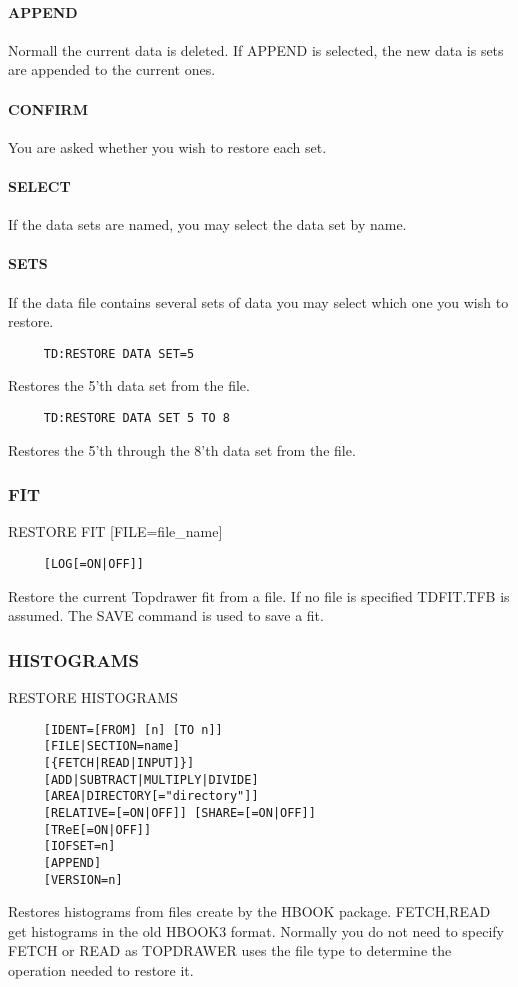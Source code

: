 \paragraph{APPEND}
Normall  the current data is deleted.  If APPEND is selected, the new
data is sets are appended to the current ones.  
\paragraph{CONFIRM}
You are asked whether you wish to restore each set.  
\paragraph{SELECT}
If the data sets are named, you may select the data set by name.  
\paragraph{SETS}
If  the  data file contains several sets of data you may select which
one you wish to restore.  
\begin{verbatim}
     TD:RESTORE DATA SET=5 
\end{verbatim}
Restores the 5'th data set from the file.  
\begin{verbatim}
     TD:RESTORE DATA SET 5 TO 8 
\end{verbatim}
Restores the 5'th through the 8'th data set from the file.  
\subsubsection{FIT}
RESTORE FIT [FILE=file\_name] 
\begin{verbatim}
     [LOG[=ON|OFF]] 
\end{verbatim}
Restore the current Topdrawer fit from a file.  If no file is specified
TDFIT.TFB is assumed.  The SAVE command is used to save a fit.  
\subsubsection{HISTOGRAMS}
RESTORE HISTOGRAMS 
\begin{verbatim}
     [IDENT=[FROM] [n] [TO n]] 
     [FILE|SECTION=name] 
     [{FETCH|READ|INPUT]}] 
     [ADD|SUBTRACT|MULTIPLY|DIVIDE] 
     [AREA|DIRECTORY[="directory"]] 
     [RELATIVE=[=ON|OFF]] [SHARE=[=ON|OFF]] 
     [TReE[=ON|OFF]] 
     [IOFSET=n] 
     [APPEND] 
     [VERSION=n] 
\end{verbatim}
Restores histograms from files create by the HBOOK package.  FETCH,READ
get histograms in the old HBOOK3 format.  Normally you do not  need  to
specify  FETCH or READ as TOPDRAWER uses the file type to determine the
operation needed to restore it.  
